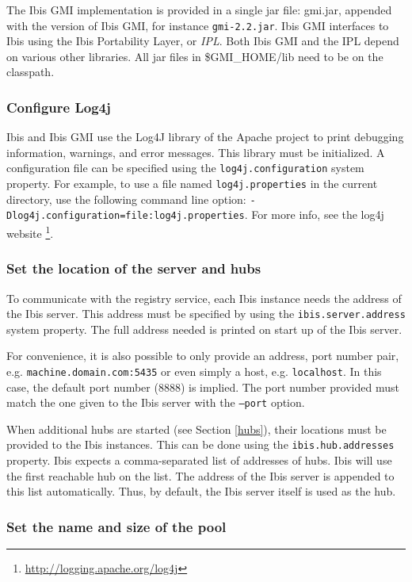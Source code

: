 \documentclass[a4paper,10pt]{article}
\begin{document}
The Ibis GMI implementation is provided in a single jar file: gmi.jar,
appended with the version of Ibis GMI, for instance \texttt{gmi-2.2.jar}.
Ibis GMI interfaces to Ibis using the Ibis Portability Layer, or
\emph{IPL}. Both Ibis GMI and the IPL depend on various other libraries.
All jar files in \$GMI\_HOME/lib need to be on the classpath.

\subsubsection{Configure Log4j}

Ibis and Ibis GMI use the Log4J library of the Apache project to print debugging
information, warnings, and error messages. This library must be
initialized. A configuration file can be specified using the
\texttt{log4j.configuration} system property. For example, to use a file
named \texttt{log4j.properties} in the current directory, use the
following command line option:
\texttt{-Dlog4j.configuration=file:log4j.properties}. For more info,
see the log4j website \footnote{\url{http://logging.apache.org/log4j}}.

\subsubsection{Set the location of the server and hubs}

To communicate with the registry service, each Ibis instance needs the address
of the Ibis server. This address must be specified by using the
\texttt{ibis.server.address} system property. The full address needed is
printed on start up of the Ibis server.

For convenience, it is also possible to only provide an address, port number
pair, e.g. \texttt{machine.domain.com:5435} or even simply a host, e.g.
\texttt{localhost}. In this case, the default port number (8888) is implied.
The port number provided must match the one given to the Ibis server
with the \texttt{--port} option.

When additional hubs are started (see Section \ref{hubs}), their locations
must be provided to the Ibis instances. This can be done using
the \texttt{ibis.hub.addresses} property. Ibis expects a comma-separated
list of addresses of hubs. Ibis will use the first reachable hub on the
list. The address of the Ibis server is appended to this list
automatically. Thus, by default, the Ibis server itself is used as the
hub.

\subsubsection{Set the name and size of the pool}
\end{document}
